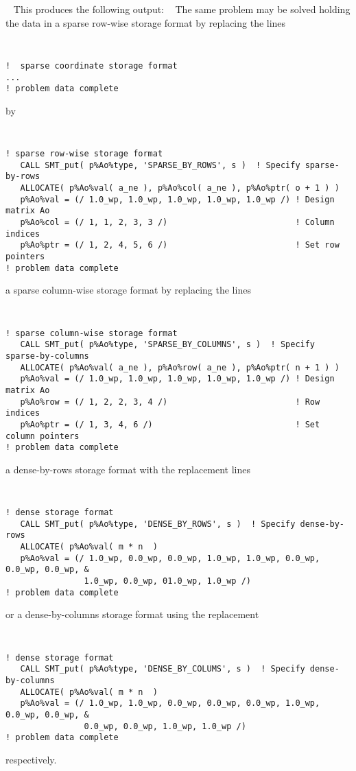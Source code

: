 \documentclass{galahad}
\begin{document}
{\tt \small
\VerbatimInput{\packageexample}
}
\noindent
This produces the following output: \vspace*{-2mm}
{\tt \small
\VerbatimInput{\packageresults}
}
\noindent
The same problem may be solved holding the data in
a sparse row-wise storage format by replacing the lines
{\tt \small
\begin{verbatim}
!  sparse coordinate storage format
...
! problem data complete
\end{verbatim}
}
\noindent
by
{\tt \small
\begin{verbatim}
! sparse row-wise storage format
   CALL SMT_put( p%Ao%type, 'SPARSE_BY_ROWS', s )  ! Specify sparse-by-rows
   ALLOCATE( p%Ao%val( a_ne ), p%Ao%col( a_ne ), p%Ao%ptr( o + 1 ) )
   p%Ao%val = (/ 1.0_wp, 1.0_wp, 1.0_wp, 1.0_wp, 1.0_wp /) ! Design matrix Ao
   p%Ao%col = (/ 1, 1, 2, 3, 3 /)                          ! Column indices
   p%Ao%ptr = (/ 1, 2, 4, 5, 6 /)                          ! Set row pointers
! problem data complete
\end{verbatim}
}
\noindent
a sparse column-wise storage format by replacing the lines
{\tt \small
\begin{verbatim}
! sparse column-wise storage format
   CALL SMT_put( p%Ao%type, 'SPARSE_BY_COLUMNS', s )  ! Specify sparse-by-columns
   ALLOCATE( p%Ao%val( a_ne ), p%Ao%row( a_ne ), p%Ao%ptr( n + 1 ) )
   p%Ao%val = (/ 1.0_wp, 1.0_wp, 1.0_wp, 1.0_wp, 1.0_wp /) ! Design matrix Ao
   p%Ao%row = (/ 1, 2, 2, 3, 4 /)                          ! Row indices
   p%Ao%ptr = (/ 1, 3, 4, 6 /)                             ! Set column pointers
! problem data complete
\end{verbatim}
}
\noindent
a dense-by-rows storage format with the replacement lines
{\tt \small
\begin{verbatim}
! dense storage format
   CALL SMT_put( p%Ao%type, 'DENSE_BY_ROWS', s )  ! Specify dense-by-rows
   ALLOCATE( p%Ao%val( m * n  )
   p%Ao%val = (/ 1.0_wp, 0.0_wp, 0.0_wp, 1.0_wp, 1.0_wp, 0.0_wp, 0.0_wp, 0.0_wp, &
                1.0_wp, 0.0_wp, 01.0_wp, 1.0_wp /)
! problem data complete
\end{verbatim}
}
\noindent
or a dense-by-columns storage format using the replacement
{\tt \small
\begin{verbatim}
! dense storage format
   CALL SMT_put( p%Ao%type, 'DENSE_BY_COLUMS', s )  ! Specify dense-by-columns
   ALLOCATE( p%Ao%val( m * n  )
   p%Ao%val = (/ 1.0_wp, 1.0_wp, 0.0_wp, 0.0_wp, 0.0_wp, 1.0_wp, 0.0_wp, 0.0_wp, &
                0.0_wp, 0.0_wp, 1.0_wp, 1.0_wp /)
! problem data complete
\end{verbatim}
}
\noindent
respectively.
\end{document}
